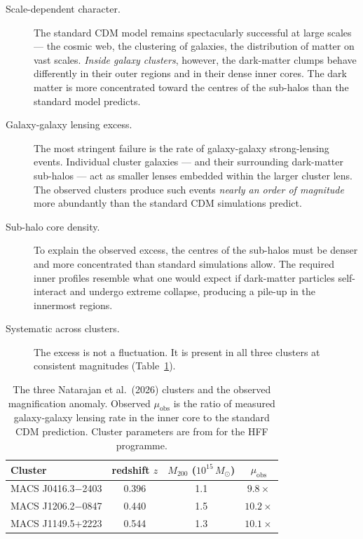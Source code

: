 \documentclass[11pt,a4paper]{article}
\theoremstyle{definition}
\theoremstyle{remark}
\begin{document}
\begin{description}
\item[Scale-dependent character.] The standard CDM model remains spectacularly successful at large scales --- the cosmic web, the clustering of galaxies, the distribution of matter on vast scales. \emph{Inside galaxy clusters}, however, the dark-matter clumps behave differently in their outer regions and in their dense inner cores. The dark matter is more concentrated toward the centres of the sub-halos than the standard model predicts.

\item[Galaxy-galaxy lensing excess.] The most stringent failure is the rate of galaxy-galaxy strong-lensing events. Individual cluster galaxies --- and their surrounding dark-matter sub-halos --- act as smaller lenses embedded within the larger cluster lens. The observed clusters produce such events \emph{nearly an order of magnitude} more abundantly than the standard CDM simulations predict.

\item[Sub-halo core density.] To explain the observed excess, the centres of the sub-halos must be denser and more concentrated than standard simulations allow. The required inner profiles resemble what one would expect if dark-matter particles self-interact and undergo extreme collapse, producing a pile-up in the innermost regions.

\item[Systematic across clusters.] The excess is not a fluctuation. It is present in all three clusters at consistent magnitudes (Table~\ref{tab:natarajan}).
\end{description}

\begin{table}[h]
\centering
\caption{The three Natarajan et al.\ (2026) clusters and the observed magnification anomaly. Observed $\mu_{\mathrm{obs}}$ is the ratio of measured galaxy-galaxy lensing rate in the inner core to the standard CDM prediction. Cluster parameters are from \citet{Lotz2017} for the HFF programme.}
\label{tab:natarajan}
\begin{tabular}{lccc}
\toprule
Cluster & redshift $z$ & $M_{200}$ ($10^{15}\,M_\odot$) & $\mu_{\mathrm{obs}}$ \\
\midrule
MACS J0416.3$-$2403 & 0.396 & 1.1 & $9.8 \times$ \\
MACS J1206.2$-$0847 & 0.440 & 1.5 & $10.2 \times$ \\
MACS J1149.5+2223   & 0.544 & 1.3 & $10.1 \times$ \\
\bottomrule
\end{tabular}
\end{table}
\end{document}
